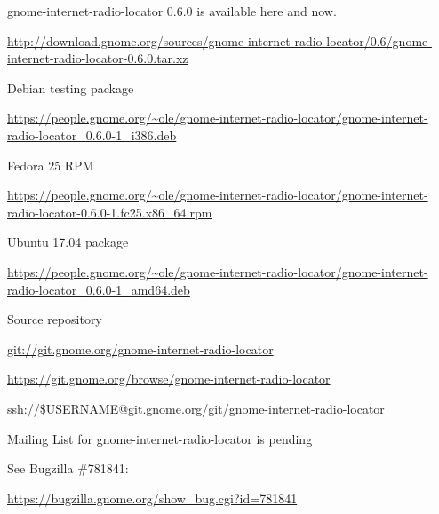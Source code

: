 \documentclass[20pt,landscape]{foils}
\begin{document}
\begin{list1}
\item gnome-internet-radio-locator 0.6.0 is available here and now.
  \begin{list2}
  \item \begin{tiny}\url{http://download.gnome.org/sources/gnome-internet-radio-locator/0.6/gnome-internet-radio-locator-0.6.0.tar.xz}\end{tiny}
  \end{list2}
\item Debian testing package
  \begin{list2}
  \item \begin{tiny}\url{https://people.gnome.org/~ole/gnome-internet-radio-locator/gnome-internet-radio-locator_0.6.0-1_i386.deb}\end{tiny}
  \end{list2}
\item Fedora 25 RPM
  \begin{list2}
  \item \begin{tiny}\url{https://people.gnome.org/~ole/gnome-internet-radio-locator/gnome-internet-radio-locator-0.6.0-1.fc25.x86_64.rpm}\end{tiny}
  \end{list2}
\item Ubuntu 17.04 package
  \begin{list2}
  \item \begin{tiny}\url{https://people.gnome.org/~ole/gnome-internet-radio-locator/gnome-internet-radio-locator_0.6.0-1_amd64.deb}\end{tiny}
  \end{list2}
\item Source repository
  \begin{list2}
    \item \url{git://git.gnome.org/gnome-internet-radio-locator}
    \item \url{https://git.gnome.org/browse/gnome-internet-radio-locator}
    \item \url{ssh://$USERNAME@git.gnome.org/git/gnome-internet-radio-locator}
  \end{list2}
\item Mailing List for gnome-internet-radio-locator is pending\\
  \begin{list2}
  \item See Bugzilla \#781841: \begin{tiny}\url{https://bugzilla.gnome.org/show_bug.cgi?id=781841}\begin{verbatim}


\end{verbatim}
\end{tiny}
\end{list2}
\end{list1}
\end{document}
